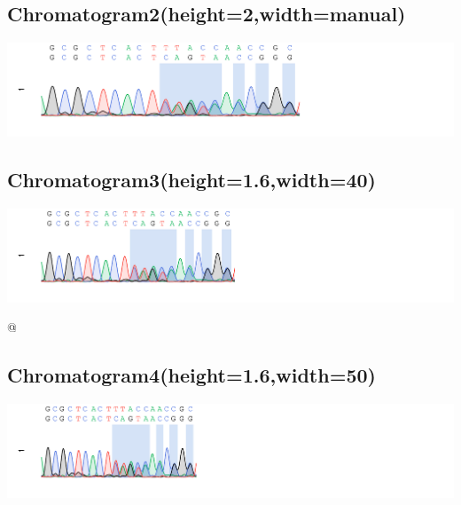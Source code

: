 \documentclass[UTF8,a4paper,landscape]{ctexart}\usepackage[]{graphicx}\usepackage[]{color}
\makeatletter
\def\maxwidth{ %
  \ifdim\Gin@nat@width>\linewidth
    \linewidth
  \else
    \Gin@nat@width
  \fi
}
\newenvironment{kframe}{%
 \def\at@end@of@kframe{}%
 \ifinner\ifhmode%
  \def\at@end@of@kframe{\end{minipage}}%
  \begin{minipage}{\columnwidth}%
 \fi\fi%
 \def\FrameCommand##1{\hskip\@totalleftmargin \hskip-\fboxsep
 \colorbox{shadecolor}{##1}\hskip-\fboxsep
     \hskip-\linewidth \hskip-\@totalleftmargin \hskip\columnwidth}%
 \MakeFramed {\advance\hsize-\width
   \@totalleftmargin\z@ \linewidth\hsize
   \@setminipage}}%
 {\par\unskip\endMakeFramed%
 \at@end@of@kframe}
\newenvironment{knitrout}{}{} %
\makeatother
\begin{document}
\newpage

\subsection*{Chromatogram2(height=2,width=manual)}
\begin{knitrout}
\color{fgcolor}
\includegraphics[width=\maxwidth]{figure/chromatogram2-1} 

\end{knitrout}

\subsection*{Chromatogram3(height=1.6,width=40)}
\begin{knitrout}
\color{fgcolor}\begin{kframe}


{\ttfamily\noindent\bfseries{}}\end{kframe}
\includegraphics[width=\maxwidth]{figure/chromatogram3-1} 

\end{knitrout}

@

\subsection*{Chromatogram4(height=1.6,width=50)}
\begin{knitrout}
\color{fgcolor}\begin{kframe}


{\ttfamily\noindent\bfseries{}}\end{kframe}
\includegraphics[width=\maxwidth]{figure/chromatogram4-1} 

\end{knitrout}
\end{document}

